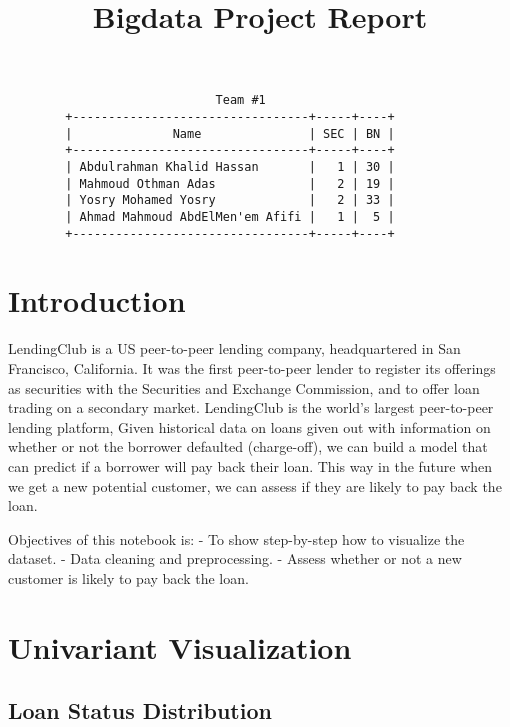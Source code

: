 \documentclass[11pt]{article}
\title{{\Huge Bigdata Project Report}}
\author{}
\begin{document}
    
    \maketitle
    
    
    {\Large 
    \begin{center}
        \begin{verbatim}
                             Team #1
        +---------------------------------+-----+----+
        |              Name               | SEC | BN |
        +---------------------------------+-----+----+
        | Abdulrahman Khalid Hassan       |   1 | 30 |
        | Mahmoud Othman Adas             |   2 | 19 |
        | Yosry Mohamed Yosry             |   2 | 33 |
        | Ahmad Mahmoud AbdElMen'em Afifi |   1 |  5 |
        +---------------------------------+-----+----+
        \end{verbatim}
    \end{center}
    }
    
    \section{Introduction}
    

    LendingClub is a US peer-to-peer lending company, headquartered in San
Francisco, California. It was the first peer-to-peer lender to register
its offerings as securities with the Securities and Exchange Commission,
and to offer loan trading on a secondary market. LendingClub is the
world's largest peer-to-peer lending platform, Given historical data on
loans given out with information on whether or not the borrower
defaulted (charge-off), we can build a model that can predict if a
borrower will pay back their loan. This way in the future when we get a
new potential customer, we can assess if they are likely to pay back the
loan.

Objectives of this notebook is: - To show step-by-step how to visualize
the dataset. - Data cleaning and preprocessing. - Assess whether or not
a new customer is likely to pay back the loan.

    \section{Univariant Visualization}

    \hypertarget{loan-status-distribution}{%
\subsection{Loan Status Distribution}\label{loan-status-distribution}}
\end{document}
